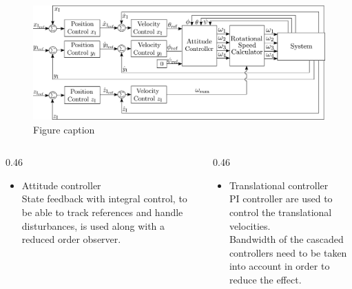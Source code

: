 \begin{figure}
	\includegraphics[width=0.7\linewidth]{figures/TranslationalControlDiagram}
	\caption{Figure caption}
\end{figure}


\begin{columns}[t,totalwidth=\twocolwid] %
	
	\begin{column}{0.46\twocolwid} %
		 \begin{itemize}
			\item Attitude controller\\
			State feedback with integral control, to be able to track references and handle disturbances, is used along with a reduced order observer.
		\end{itemize}
	\end{column} %
	
	\begin{column}{0.46\twocolwid} %
		 \begin{itemize}
			\item Translational controller\\
			PI controller are used to control the translational velocities.\\
			Bandwidth of the cascaded controllers need to be taken into account in order to reduce the effect.
		\end{itemize}		
	\end{column} %
	
\end{columns} %